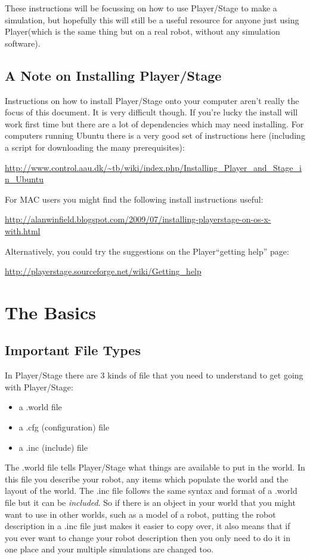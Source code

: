 \documentclass[a4paper]{report}
\newcommand{\plst}{Player/Stage\xspace}
\newcommand{\pl}{Player\xspace}
\begin{document}
These instructions will be focussing on how to use \plst to make a simulation, but hopefully this will still be a useful resource for anyone just using \pl (which is the same thing but on a real robot, without any simulation software).

\section{A Note on Installing \plst}
Instructions on how to install \plst onto your computer aren't really the focus of this document. It is very difficult though. If you're lucky the install will work first time but there are a lot of dependencies which may need installing. For computers running Ubuntu there is a very good set of instructions here (including a script for downloading the many prerequisites):
\begin{center}
\url{http://www.control.aau.dk/~tb/wiki/index.php/Installing_Player_and_Stage_in_Ubuntu}
\end{center}
For MAC users you might find the following install instructions useful:
\begin{center}
\url{http://alanwinfield.blogspot.com/2009/07/installing-playerstage-on-os-x-with.html}
\end{center}
Alternatively, you could try the suggestions on the \pl ``getting help'' page:
\begin{center}
	\url{http://playerstage.sourceforge.net/wiki/Getting_help}
\end{center}




\chapter{The Basics}\label{sec:Basics}

\section{Important File Types}\label{sec:Basics:FileTypes}
In \plst there are 3 kinds of file that you need to understand to get going with \plst:
\begin{itemize}
	\item a .world file
	\item a .cfg (configuration) file
	\item a .inc (include) file
\end{itemize}
The .world file tells \plst what things are available to put in the world. In this file you describe your robot, any items which populate the world and the layout of the world. The .inc file follows the same syntax and format of a .world file but it can be \emph{included}. So if there is an object in your world that you might want to use in other worlds, such as a model of a robot, putting the robot description in a .inc file just makes it easier to copy over, it also means that if you ever want to change your robot description then you only need to do it in one place and your multiple simulations are changed too.
\end{document}
